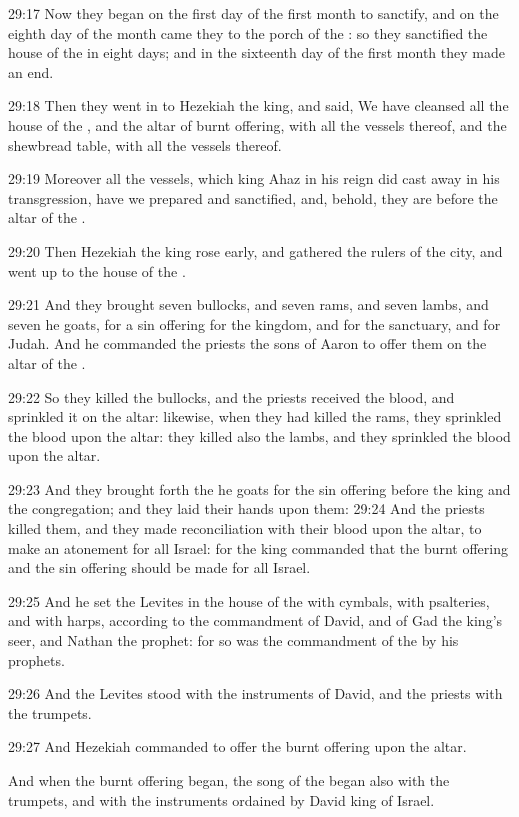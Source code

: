 29:17 Now they began on the first day of the first month to sanctify,
and on the eighth day of the month came they to the porch of the \LORD:
so they sanctified the house of the \LORD in eight days; and in the
sixteenth day of the first month they made an end.

29:18 Then they went in to Hezekiah the king, and said, We have
cleansed all the house of the \LORD, and the altar of burnt offering,
with all the vessels thereof, and the shewbread table, with all the
vessels thereof.

29:19 Moreover all the vessels, which king Ahaz in his reign did cast
away in his transgression, have we prepared and sanctified, and,
behold, they are before the altar of the \LORD.

29:20 Then Hezekiah the king rose early, and gathered the rulers of
the city, and went up to the house of the \LORD.

29:21 And they brought seven bullocks, and seven rams, and seven
lambs, and seven he goats, for a sin offering for the kingdom, and for
the sanctuary, and for Judah. And he commanded the priests the sons of
Aaron to offer them on the altar of the \LORD.

29:22 So they killed the bullocks, and the priests received the blood,
and sprinkled it on the altar: likewise, when they had killed the
rams, they sprinkled the blood upon the altar: they killed also the
lambs, and they sprinkled the blood upon the altar.

29:23 And they brought forth the he goats for the sin offering before
the king and the congregation; and they laid their hands upon them:
29:24 And the priests killed them, and they made reconciliation with
their blood upon the altar, to make an atonement for all Israel: for
the king commanded that the burnt offering and the sin offering should
be made for all Israel.

29:25 And he set the Levites in the house of the \LORD with cymbals,
with psalteries, and with harps, according to the commandment of
David, and of Gad the king's seer, and Nathan the prophet: for so was
the commandment of the \LORD by his prophets.

29:26 And the Levites stood with the instruments of David, and the
priests with the trumpets.

29:27 And Hezekiah commanded to offer the burnt offering upon the
altar.

And when the burnt offering began, the song of the \LORD began also
with the trumpets, and with the instruments ordained by David king of
Israel.

